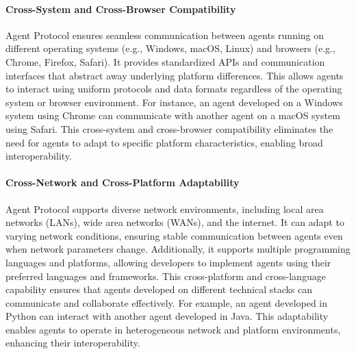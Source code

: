 \documentclass[10pt,preprint]{article}
\begin{document}
\paragraph{Cross-System and Cross-Browser Compatibility} Agent Protocol ensures seamless communication between agents running on different operating systems (e.g., Windows, macOS, Linux) and browsers (e.g., Chrome, Firefox, Safari). It provides standardized APIs and communication interfaces that abstract away underlying platform differences. This allows agents to interact using uniform protocols and data formats regardless of the operating system or browser environment. For instance, an agent developed on a Windows system using Chrome can communicate with another agent on a macOS system using Safari. This cross-system and cross-browser compatibility eliminates the need for agents to adapt to specific platform characteristics, enabling broad interoperability.

\paragraph{Cross-Network and Cross-Platform Adaptability} Agent Protocol supports diverse network environments, including local area networks (LANs), wide area networks (WANs), and the internet. It can adapt to varying network conditions, ensuring stable communication between agents even when network parameters change. Additionally, it supports multiple programming languages and platforms, allowing developers to implement agents using their preferred languages and frameworks. This cross-platform and cross-language capability ensures that agents developed on different technical stacks can communicate and collaborate effectively. For example, an agent developed in Python can interact with another agent developed in Java. This adaptability enables agents to operate in heterogeneous network and platform environments, enhancing their interoperability.

\end{document}
